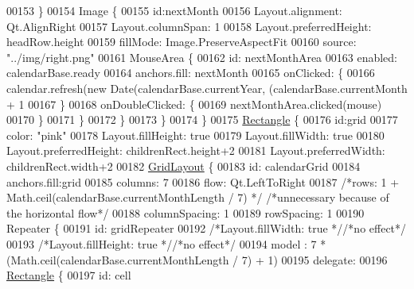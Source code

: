\begin{DoxyCode}
{{{00153                 \}
00154                 Image \{
00155                     \textcolor{keywordtype}{id}:nextMonth
00156                     Layout.alignment: Qt.AlignRight
00157                     Layout.columnSpan: 1
00158                     Layout.preferredHeight: headRow.height
00159                     fillMode: Image.PreserveAspectFit
00160                     source: \textcolor{stringliteral}{"../img/right.png"}
00161                     MouseArea \{
00162                         \textcolor{keywordtype}{id}:  nextMonthArea
00163                         enabled: calendarBase.ready
00164                         anchors.fill: nextMonth
00165                         onClicked: \{
00166                             calendar.refresh(\textcolor{keyword}{new} Date(calendarBase.currentYear, (calendarBase.currentMonth 
      + 1 %
00167                         \}
00168                         onDoubleClicked: \{
00169                             nextMonthArea.clicked(mouse)
00170                         \}
00171                     \}
00172                 \}
00173             \}
00174         \}
00175         \hyperlink{classRectangle}{Rectangle} \{
00176             \textcolor{keywordtype}{id}:grid
00177             color: \textcolor{stringliteral}{"pink"}
00178             Layout.fillHeight: \textcolor{keyword}{true}
00179             Layout.fillWidth: \textcolor{keyword}{true}
00180             Layout.preferredHeight: childrenRect.height+2
00181             Layout.preferredWidth: childrenRect.width+2
00182             \hyperlink{classGridLayout}{GridLayout} \{
00183                 \textcolor{keywordtype}{id}: calendarGrid
00184                 anchors.fill:grid
00185                 columns: 7
00186                 flow: Qt.LeftToRight
00187                 \textcolor{comment}{/*rows: 1 + Math.ceil(calendarBase.currentMonthLength / 7) */} \textcolor{comment}{/*unnecessary because of the
       horizontal flow*/}
00188                 columnSpacing: 1
00189                 rowSpacing: 1
00190                 Repeater \{
00191                     \textcolor{keywordtype}{id}: gridRepeater
00192                     \textcolor{comment}{/*Layout.fillWidth: true */}\textcolor{comment}{/*no effect*/}
00193                     \textcolor{comment}{/*Layout.fillHeight: true */}\textcolor{comment}{/*no effect*/}
00194                     model : 7 * (Math.ceil(calendarBase.currentMonthLength / 7) + 1)
00195                     delegate:
00196                         \hyperlink{classRectangle}{Rectangle} \{
00197                         \textcolor{keywordtype}{id}: cell
}}}
\end{DoxyCode}

